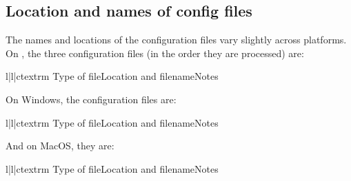 \documentclass{howto}
\begin{document}
\subsection{Location and names of config files}
\label{config-filenames}

The names and locations of the configuration files vary slightly across
platforms.  On \UNIX, the three configuration files (in the order they
are processed) are:
\begin{tableiii}{l|l|c}{textrm}
  {Type of file}{Location and filename}{Notes}
\end{tableiii}

On Windows, the configuration files are:
\begin{tableiii}{l|l|c}{textrm}
  {Type of file}{Location and filename}{Notes}
\end{tableiii}

And on MacOS, they are:
\begin{tableiii}{l|l|c}{textrm}
  {Type of file}{Location and filename}{Notes}
\end{tableiii}
\end{document}
